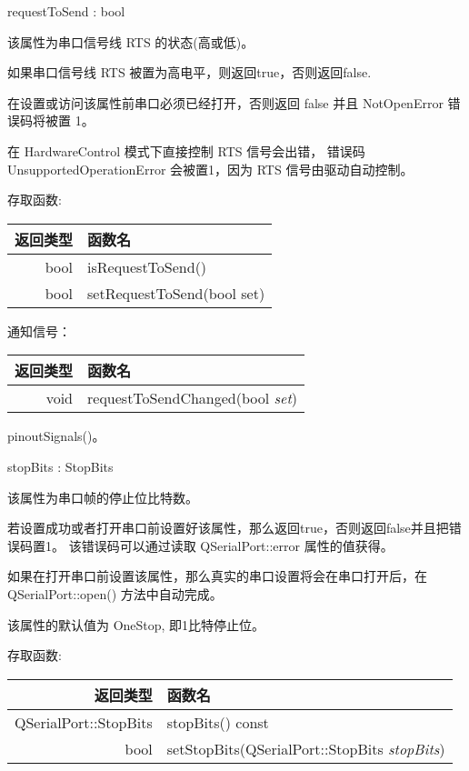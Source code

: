 requestToSend : bool

该属性为串口信号线 RTS 的状态(高或低)。

如果串口信号线 RTS 被置为高电平，则返回true，否则返回false.

\begin{notice}
在设置或访问该属性前串口必须已经打开，否则返回 false 并且 NotOpenError 错误码将被置 1。
\end{notice}

\begin{notice}
在 HardwareControl 模式下直接控制 RTS 信号会出错， 错误码 UnsupportedOperationError 会被置1，因为 RTS 信号由驱动自动控制。
\end{notice}

存取函数:

\begin{tabular}{|r|l|}
\hline
返回类型 &	函数名 \\ 
\hline
bool &	isRequestToSend() \\ 
\hline
bool 	& setRequestToSend(bool set) \\ 
\hline
\end{tabular}

通知信号：

\begin{tabular}{|r|l|}
\hline
返回类型 &	函数名 \\ 
\hline
void &	requestToSendChanged(bool \emph{set}) \\ 
\hline
\end{tabular}

\begin{seeAlso}
pinoutSignals()。
\end{seeAlso}

stopBits : StopBits

该属性为串口帧的停止位比特数。

若设置成功或者打开串口前设置好该属性，那么返回true，否则返回false并且把错误码置1。
该错误码可以通过读取 QSerialPort::error 属性的值获得。

\begin{notice}
如果在打开串口前设置该属性，那么真实的串口设置将会在串口打开后，在 QSerialPort::open() 方法中自动完成。
\end{notice}

该属性的默认值为 OneStop, 即1比特停止位。

存取函数:

\begin{tabular}{|r|l|}
	\hline
	返回类型 &	函数名 \\ 
	\hline
	QSerialPort::StopBits &	stopBits() const\\
	\hline
	bool 	&setStopBits(QSerialPort::StopBits \emph{stopBits}) \\
	\hline
	\end{tabular}

